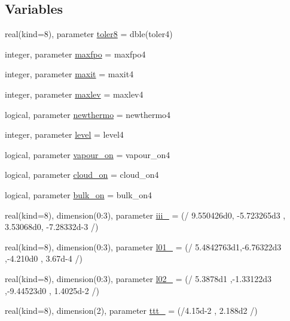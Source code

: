 \subsection*{Variables}
\begin{DoxyCompactItemize}
\item 
real(kind=8), parameter \hyperlink{namespacetherm__lib8_a8b637ec830ea211fe50a2365a9a5d1e2}{toler8} = dble(toler4)
\item 
integer, parameter \hyperlink{namespacetherm__lib8_ae43667eb586a48e36ec5508be0a58153}{maxfpo} = maxfpo4
\item 
integer, parameter \hyperlink{namespacetherm__lib8_a1fff65e6f008a88c6c8ebecbc85f518c}{maxit} = maxit4
\item 
integer, parameter \hyperlink{namespacetherm__lib8_a8608aff039402524592e0c7b6cdeac27}{maxlev} = maxlev4
\item 
logical, parameter \hyperlink{namespacetherm__lib8_acf7c73667b035fd1eb6ab1d3924e941e}{newthermo} = newthermo4
\item 
integer, parameter \hyperlink{namespacetherm__lib8_a5aa70fb6d66e28229c98896efb7d03d9}{level} = level4
\item 
logical, parameter \hyperlink{namespacetherm__lib8_a8dcf3ae8ee8dc104aaded77571f2be33}{vapour\+\_\+on} = vapour\+\_\+on4
\item 
logical, parameter \hyperlink{namespacetherm__lib8_a826524c63660fd35bee5d07fa43c19e0}{cloud\+\_\+on} = cloud\+\_\+on4
\item 
logical, parameter \hyperlink{namespacetherm__lib8_aa2d5118204fcd26e0603d47b2bd1a48c}{bulk\+\_\+on} = bulk\+\_\+on4
\item 
real(kind=8), dimension(0\+:3), parameter \hyperlink{namespacetherm__lib8_ae4acd61a7c0e6a8e640771554e879769}{iii\+\_} = (/ 9.\+550426d0, -\/5.\+723265d3 , 3.\+53068d0, -\/7.\+28332d-\/3 /)
\item 
real(kind=8), dimension(0\+:3), parameter \hyperlink{namespacetherm__lib8_a2874cfd6a2661d95f8a2b827ebbd1d5d}{l01\+\_} = (/ 5.\+4842763d1,-\/6.\+76322d3 ,-\/4.\+210d0 , 3.\+67d-\/4 /)
\item 
real(kind=8), dimension(0\+:3), parameter \hyperlink{namespacetherm__lib8_ab6c640a78c761844912d94aac7c317b8}{l02\+\_} = (/ 5.\+3878d1 ,-\/1.\+33122d3 ,-\/9.\+44523d0 , 1.\+4025d-\/2 /)
\item 
real(kind=8), dimension(2), parameter \hyperlink{namespacetherm__lib8_a5879d4524f2706a75384614d311d91c7}{ttt\+\_} = (/4.\+15d-\/2 , 2.\+188d2 /)
\item 

\end{DoxyCompactItemize}
